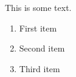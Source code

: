 \documentclass{article}
\begin{document}
This is some text.

\begin{enumerate}
\item First item
\item Second item
\item Third item
\end{enumerate}
\end{document}
